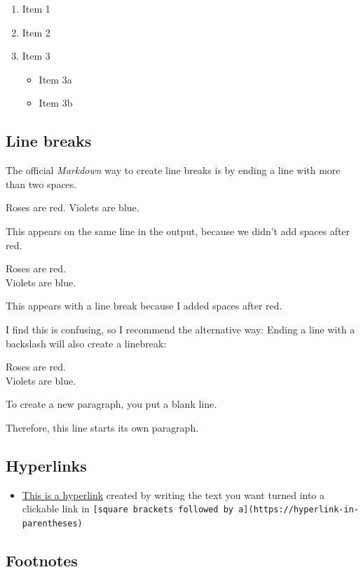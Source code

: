 \documentclass[a4paper, nobind]{templates/ociamthesis}
\providecommand{\tightlist}{%
  \setlength{\itemsep}{0pt}\setlength{\parskip}{0pt}}
\begin{document}
\begin{enumerate}
\def\labelenumi{\arabic{enumi}.}
\tightlist
\item
  Item 1
\item
  Item 2
\item
  Item 3

  \begin{itemize}
  \tightlist
  \item
    Item 3a
  \item
    Item 3b
  \end{itemize}
\end{enumerate}

\subsection{Line breaks}\label{line-breaks}

The official \emph{Markdown} way to create line breaks is by ending a line with more than two spaces.

Roses are red.
Violets are blue.

This appears on the same line in the output, because we didn't add spaces after red.

Roses are red.\\
Violets are blue.

This appears with a line break because I added spaces after red.

I find this is confusing, so I recommend the alternative way: Ending a line with a backslash will also create a linebreak:

Roses are red.\\
Violets are blue.

To create a new paragraph, you put a blank line.

Therefore, this line starts its own paragraph.

\subsection{Hyperlinks}\label{hyperlinks}

\begin{itemize}
\tightlist
\item
  \href{https://www.google.com}{This is a hyperlink} created by writing the text you want turned into a clickable link in \texttt{{[}square\ brackets\ followed\ by\ a{]}(https://hyperlink-in-parentheses)}
\end{itemize}

\subsection{Footnotes}\label{footnotes}
\end{document}
